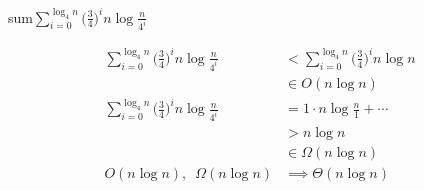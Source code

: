 sum\question $\displaystyle\sum_{i = 0}^{\log_4{n}} \Big(\frac{3}{4}\Big)^i n\log{\frac{n}{4^i}}$
\begin{solution}[2in]
\begin{align*}
\sum_{i = 0}^{\log_4{n}} \Big(\frac{3}{4}\Big)^i n\log{\frac{n}{4^i}}
&< \sum_{i = 0}^{\log_4{n}} \Big(\frac{3}{4}\Big)^i n\log{n} \\
&\in O(n\log{n}) \\
\sum_{i = 0}^{\log_4{n}} \Big(\frac{3}{4}\Big)^i n\log{\frac{n}{4^i}}
&= 1 \cdot n\log{\frac{n}{1}} + \cdots \\
&> n\log{n} \\
&\in \Omega(n\log{n}) \\
O(n\log{n}), \enspace \Omega(n\log{n}) &\implies \Theta(n\log{n})
\end{align*}
\end{solution}
